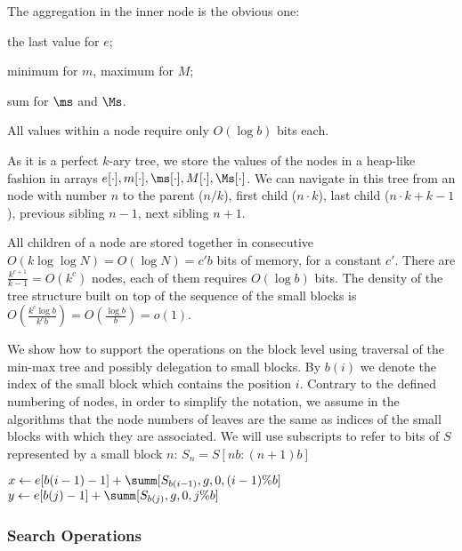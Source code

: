 The aggregation in the inner node is the obvious one:
\begin{iteminline}
	\item the last value for $e$;
	\item minimum for $m$, maximum for $M$;
	\item sum for $\ms$ and $\Ms$.
\end{iteminline}
All values within a node require only $O(\log b)$ bits each.

As it is a perfect $k$-ary tree, we store the values of the nodes in a heap-like fashion in arrays $e[\cdot], m[\cdot], \ms[\cdot], M[\cdot], \Ms[\cdot]$.
We can navigate in this tree from an node with number $n$ to the parent ($n / k$), first child ($n \cdot k$), last child ($n \cdot k + k - 1$), previous sibling $n - 1$, next sibling $n + 1$.

All children of a node are stored together in consecutive $O(k \log \log N) = O(\log N) = c' b$ bits of memory, for a constant $c'$.
There are $\frac{k^{c + 1}}{k - 1} = O(k^c)$ nodes, each of them requires $O(\log b)$ bits.
The density of the tree structure built on top of the sequence of the small blocks is $O(\frac{k^c \log b}{k^c b}) = O(\frac{\log b}{b}) = o(1)$.

\bigskip

We show how to support the operations on the block level using traversal of the min-max tree and possibly delegation to small blocks.
By $b(i)$ we denote the index of the small block which contains the position $i$.
Contrary to the defined numbering of nodes, in order to simplify the notation, we assume in the algorithms that the node numbers of leaves are the same as indices of the small blocks with which they are associated.
We will use subscripts to refer to bits of $S$ represented by a small block $n$: $S_n = S[n b : (n + 1) b]$

\begin{algorithm}
\begin{algorithmic}
	\State $x \gets e[b(i - 1) - 1] + \summ[S_{b(i - 1)}, g, 0, (i - 1) \% b]$
	\State $y \gets e[b(j) - 1] + \summ[S_{b(j)}, g, 0, j \% b]$
	\State {}
\EndFunction
\end{algorithmic}
\end{algorithm}

\subsubsection{Search Operations}

